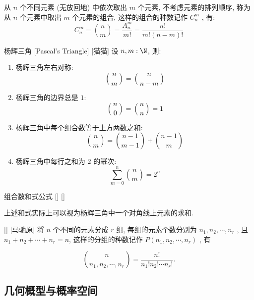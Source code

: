 \documentclass[UTF8]{ctexart}
\begin{document}
        \begin{prf}
            从 \(n\) 个不同元素 (无放回地) 中依次取出 \(m\) 个元素, 不考虑元素的排列顺序, 称为从 \(n\) 个元素中取出 \(m\) 个元素的组合, 这样的组合的种数记作 \(C_n^m\) , 有: 
            \[C_n^m=\binom{n}{m}=\frac{A_n^m}{m!}=\frac{n!}{m!(n-m)!}\]
        \end{prf}

        \begin{ppt}
            []
            {杨辉三角}
            [Pascal's Triangle]
            [猫猫]
            设 \(n, m:\N\), 则:
            \begin{enumerate}
                \item 杨辉三角左右对称: 
                    \[\binom{n}{m}=\binom{n}{n-m}\]
                \item 杨辉三角的边界总是 \(1\): 
                    \[\binom{n}{0}=\binom{n}{n}=1\]
                \item 杨辉三角中每个组合数等于上方两数之和: 
                    \[\binom{n}{m}=\binom{n-1}{m-1}+\binom{n-1}{m}\]
                \item 杨辉三角中每行之和为 \(2\) 的幂次:
                    \[\sum_{m=0}^{n}\binom{n}{m}=2^n\]
            \end{enumerate}
        \end{ppt}

        \begin{ppt}
            []
            {组合数和式公式}
            []
            []
        \end{ppt}

        \begin{rmk}
            [猫猫]
            上述和式实际上可以视为杨辉三角中一个对角线上元素的求和. 
        \end{rmk}

        \begin{xmp}
            []
            {}
            []
            [马驰原]
            将 \(n\) 个不同的元素分成 \(r\) 组, 每组的元素个数分别为 \(n_1,n_2,\cdots,n_r\) , 且 \(n_1+n_2+\cdots+n_r=n\), 这样的分组的种数记作 \(P(n_1,n_2,\cdots,n_r)\) , 有
            
            \[\binom{n}{n_1,n_2,\cdots,n_r}=\frac{n!}{n_1!n_2!\cdots n_r!}.\]
        \end{xmp}
    
    \subsection{几何概型与概率空间}
        
\end{document}
